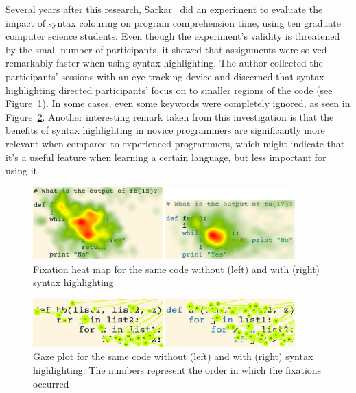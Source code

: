Several years after this research, Sarkar~\cite{Sarkar2015} did an experiment to evaluate the impact of syntax colouring on program comprehension time, using ten graduate computer science students. Even though the experiment's validity is threatened by the small number of participants, it showed that assignments were solved remarkably faster when using syntax highlighting. The author collected the participants' sessions with an eye-tracking device and discerned that syntax highlighting directed participants' focus on to smaller regions of the code (see Figure~\ref{fig:06_syntaxhighligh2}). In some cases, even some keywords were completely ignored, as seen in Figure~\ref{fig:06_syntaxhighligh3}. Another interesting remark taken from this investigation is that the benefits of syntax highlighting in novice programmers are significantly more relevant when compared to experienced programmers, which might indicate that it's a useful feature when learning a certain language, but less important for using it.

\begin{figure}[ht]
\centering
\includegraphics[width=0.9\textwidth]{Chapters/figures/4_RelatedWork/04_SyntaxHighlight2.png}
\caption{Fixation heat map for the same code without (left) and with (right) syntax highlighting~\cite{Sarkar2015}}
\label{fig:06_syntaxhighligh2}
\end{figure}

\begin{figure}[ht]
\centering
\includegraphics[width=0.9\textwidth]{Chapters/figures/4_RelatedWork/04_SyntaxHighlight3.png}
\caption{Gaze plot for the same code without (left) and with (right) syntax highlighting. The numbers represent the order in which the fixations occurred~\cite{Sarkar2015}}
\label{fig:06_syntaxhighligh3}
\end{figure}

